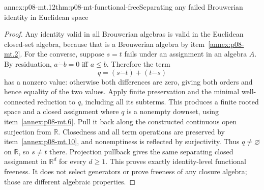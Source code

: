 \begin{annexitem}{annex:p08-mt.12}{thm:p08-mt-functional-free}{Separating any failed Brouwerian identity in Euclidean space}
\begin{proof}
Any identity valid in all Brouwerian algebras is valid in the Euclidean
closed-set algebra, because that is a Brouwerian algebra by
item~\ref{annex:p08-mt.2}. For the converse, suppose \(s=t\) fails
under an assignment in an algebra \(A\). By residuation,
\(a\mathbin{\dot{-}}b=0\) iff \(a\leq b\). Therefore the term
\[
 q=(s\mathbin{\dot{-}}t)+(t\mathbin{\dot{-}}s)
\]
has a nonzero value: otherwise both differences are zero, giving both
orders and hence equality of the two values.
Apply finite preservation and the minimal well-connected reduction to
\(q\), including all its subterms. This produces a finite rooted
space and a closed assignment where \(q\) is a nonempty downset,
using item~\ref{annex:p08-mt.6}. Pull it back along the constructed
continuous open surjection from \(\mathbb R\). Closedness and all
term operations are preserved by item~\ref{annex:p08-mt.10}, and
nonemptiness is reflected by surjectivity. Thus \(q\ne\varnothing\)
on \(\mathbb R\), so \(s\ne t\) there. Projection pullback gives
the same separating closed assignment in \(\mathbb R^d\) for every
\(d\geq1\). This proves exactly identity-level functional freeness.
It does not select generators or prove freeness of any closure algebra;
those are different algebraic properties.
\end{proof}
\end{annexitem}

